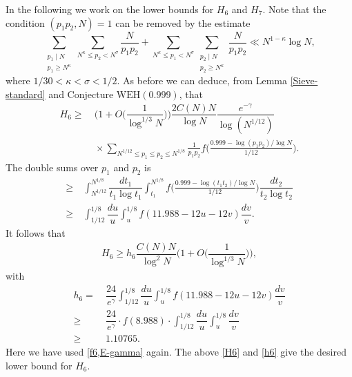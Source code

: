 \documentclass[12pt, a4paper]{amsart}
\def\leq{\leqslant}
\def\le{\leqslant}
\def\ge{\geqslant}
\theoremstyle{plain}
\theoremstyle{remark}
\numberwithin{equation}{section}
\begin{document}
In the following we work on the lower bounds for $H_6$ and $H_7$.
Note that the condition $(p_{1}p_{2},N)=1$ can be removed by the estimate
\begin{equation}
\sum_{\substack{p_{1}\mid N\\ p_{1}\ge N^{\kappa}}}\sum_{N^{\kappa}\le p_{2}<N^{\sigma}}\frac{N}{p_{1}p_{2}}+\sum_{N^{\kappa}\le p_{1}<N^{\sigma}}\sum_{\substack{p_{2}\mid N\\ p_{2}\ge N^{\kappa}}}\frac{N}{p_{1}p_{2}}\ll N^{1-\kappa}\log N,
\end{equation}
where $1/30<\kappa<\sigma<1/2$. As before we can deduce, from Lemma \ref{Sieve-standard} and Conjecture $\mathrm{WEH}(0.999)$, that
\begin{equation*}
\begin{aligned}
H_6 
\ge&\ 
\bigg(1+O\bigg(\dfrac{1}{\log^{1/3}N}\bigg)\bigg)\dfrac{2C(N)N}{\log N} \dfrac{e^{-\gamma}}{\log (N^{1/12})} \\ 
&\ \times \sum_{N^{1/12} \leq p_1 \le p_2 \le N^{1/8}} \frac{1}{p_1p_2}f\bigg(\frac{0.999-\log (p_1p_2)/\log N}{1/12}\bigg). 
\end{aligned}
\end{equation*}
The double sums over $p_1$ and $p_2$ is 
\begin{equation*}
\begin{aligned}
\ge&\ 
\int_{N^{1/12}}^{N^{1/8}} \dfrac{dt_1}{t_1\log t_1}\int_{t_1}^{N^{1/8}}f\bigg(\frac{0.999-\log (t_1t_2)/\log N}{1/12}\bigg)\dfrac{dt_2}{t_2\log t_2}\\
\ge&\ \int_{1/12}^{1/8}\dfrac{du}{u}\int_{u}^{1/8} f(11.988-12u-12v)\dfrac{dv}{v}. 
\end{aligned}
\end{equation*}
It follows that 
\begin{equation}\label{H6}
\begin{aligned}
H_6\ge h_6\dfrac{C(N)N}{\log^2 N}\bigg(1+O\bigg(\dfrac{1}{\log^{1/3}N}\bigg)\bigg),
\end{aligned}
\end{equation}
with 
\begin{equation}\label{h6}
\begin{aligned}
h_{6}=\ & \dfrac{24}{e^{\gamma}} 
\int_{1/12}^{1/8}\dfrac{du}{u}\int_{u}^{1/8}f(11.988-12u-12v)\dfrac{dv}{v}\\
\ge\ & \dfrac{24}{e^{\gamma}} \cdot f(8.988) \cdot \int_{1/12}^{1/8}\dfrac{du}{u}\int_{u}^{1/8}\dfrac{dv}{v}\\
\ge\ & 1.10765.
\end{aligned}
\end{equation}
Here we have used \eqref{f6,E-gamma} again. 
The above \eqref{H6} and \eqref{h6} give the desired lower bound for $H_6$.
\end{document}
